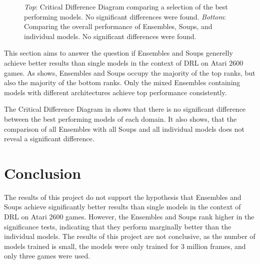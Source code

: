 \begin{figure}[ht!]
    \centering

    \caption{\textit{Top}: Critical Difference Diagram comparing a selection of the best performing models. No significant differences were found. \textit{Bottom}: Comparing the overall performance of Ensembles, Soups, and individual models. No significant differences were found.}
    \label{fig:cdd}
\end{figure}

This section aims to answer the question if Ensembles and Soups generelly achieve better results than single models in the context of DRL on Atari 2600 games. As  shows, Ensembles and Soups occupy the majority of the top ranks, but also the majority of the bottom ranks. Only the mixed Ensembles containing models with different architectures achieve top performance consistently. 

The Critical Difference Diagram in  shows that there is no significant difference between the best performing models of each domain. It also shows, that the comparison of all Ensembles with all Soups and all individual models does not reveal a significant difference.


\FloatBarrier
\chapter{Conclusion}

The results of this project do not support the hypothesis that Ensembles and Soups achieve significantly better results than single models in the context of DRL on Atari 2600 games. However, the Ensembles and Soups rank higher in the significance tests, indicating that they perform marginally better than the individual models. The results of this project are not conclusive, as the number of models trained is small, the models were only trained for 3 million frames, and only three games were used. 


